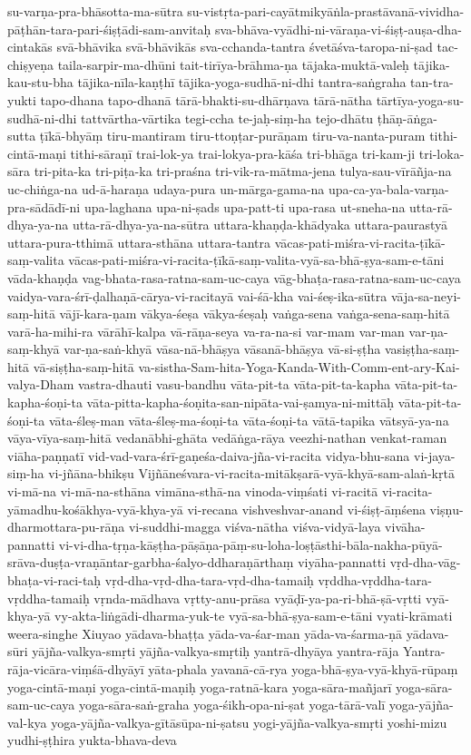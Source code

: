 {su-varṇa-pra-bhāsotta-ma-sūtra
su-vistṛta-pari-cayātmikyāṅla-prastāvanā-vividha-pāṭhān-tara-pari-śiṣṭādi-sam-anvitaḥ
sva-bhāva-vyādhi-ni-vāraṇa-vi-śiṣṭ-auṣa-dha-cintakās
svā-bhāvika
svā-bhāvikās
sva-cchanda-tantra
śvetāśva-taropa-ni-ṣad
tac-chiṣyeṇa
taila-sarpir-ma-dhūni
tait-tirīya-brāhma-ṇa
tājaka-muktā-valeḥ
tājika-kau-stu-bha
tājika-nīla-kaṇṭhī
tājika-yoga-sudhā-ni-dhi
tantra-saṅgraha
tan-tra-yukti
tapo-dhana
tapo-dhanā
tārā-bhakti-su-dhārṇava
tārā-nātha
tārtīya-yoga-su-sudhā-ni-dhi
tattvārtha-vārtika
tegi-ccha
te-jaḥ-siṃ-ha
tejo-dhātu
ṭhāṇ-āṅga-sutta
ṭīkā-bhyāṃ
tiru-mantiram
tiru-ttoṇṭar-purāṇam
tiru-va-nanta-puram
tithi-cintā-maṇi
tithi-sāraṇī
trai-lok-ya
trai-lokya-pra-kāśa
tri-bhāga
tri-kam-ji
tri-loka-sāra
tri-pita-ka
tri-piṭa-ka
tri-praśna
tri-vik-ra-mātma-jena
tulya-sau-vīrāñja-na
uc-chiṅga-na
ud-ā-haraṇa
udaya-pura
un-mārga-gama-na
upa-ca-ya-bala-varṇa-pra-sādādī-ni
upa-laghana
upa-ni-ṣads
upa-patt-ti
upa-rasa
ut-sneha-na
utta-rā-dhya-ya-na
utta-rā-dhya-ya-na-sūtra
uttara-khaṇḍa-khādyaka
uttara-paurastyā
uttara-pura-tthimā
uttara-sthāna
uttara-tantra
vācas-pati-miśra-vi-racita-ṭīkā-saṃ-valita
vācas-pati-miśra-vi-racita-ṭīkā-saṃ-valita-vyā-sa-bhā-ṣya-sam-e-tāni
vāda-khaṇḍa
vag-bhata-rasa-ratna-sam-uc-caya
vāg-bhaṭa-rasa-ratna-sam-uc-caya
vaidya-vara-śrī-ḍalhaṇā-cārya-vi-racitayā
vai-śā-kha
vai-śeṣ-ika-sūtra
vāja-sa-neyi-saṃ-hitā
vājī-kara-ṇam
vākya-śeṣa
vākya-śeṣaḥ
vaṅga-sena
vaṅga-sena-saṃ-hitā
varā-ha-mihi-ra
vārāhī-kalpa
vā-rāṇa-seya
va-ra-na-si
var-mam
var-man
var-ṇa-saṃ-khyā
var-ṇa-saṅ-khyā
vāsa-nā-bhāṣya
vāsanā-bhāṣya
vā-si-ṣṭha
vasiṣṭha-saṃ-hitā
vā-siṣṭha-saṃ-hitā
va-sistha-Sam-hita-Yoga-Kanda-With-Comm-ent-ary-Kai-valya-Dham
vastra-dhauti
vasu-bandhu
vāta-pit-ta
vāta-pit-ta-kapha
vāta-pit-ta-kapha-śoṇi-ta
vāta-pitta-kapha-śoṇita-san-nipāta-vai-ṣamya-ni-mittāḥ
vāta-pit-ta-śoṇi-ta
vāta-śleṣ-man
vāta-śleṣ-ma-śoṇi-ta
vāta-śoṇi-ta
vātā-tapika
vātsyā-ya-na
vāya-vīya-saṃ-hitā
vedanābhi-ghāta
vedāṅga-rāya
veezhi-nathan
venkat-raman
viāha-paṇṇatī
vid-vad-vara-śrī-gaṇeśa-daiva-jña-vi-racita
vidya-bhu-sana
vi-jaya-siṃ-ha
vi-jñāna-bhikṣu
Vijñāneśvara-vi-racita-mitākṣarā-vyā-khyā-sam-alaṅ-kṛtā
vi-mā-na
vi-mā-na-sthāna
vimāna-sthā-na
vinoda-viṃśati
vi-racitā
vi-racita-yāmadhu-kośākhya-vyā-khya-yā
vi-recana
vishveshvar-anand
vi-śiṣṭ-āṃśena
viṣṇu-dharmottara-pu-rāṇa
vi-suddhi-magga
viśva-nātha
viśva-vidyā-laya
vivāha-pannatti
vi-vi-dha-tṛṇa-kāṣṭha-pāṣāṇa-pāṃ-su-loha-loṣṭāsthi-bāla-nakha-pūyā-srāva-duṣṭa-vraṇāntar-garbha-śalyo-ddharaṇārthaṃ
viyāha-pannatti
vṛd-dha-vāg-bhaṭa-vi-raci-taḥ
vṛd-dha-vṛd-dha-tara-vṛd-dha-tamaiḥ
vṛddha-vṛddha-tara-vṛddha-tamaiḥ
vṛnda-mādhava
vṛtty-anu-prāsa
vyāḍī-ya-pa-ri-bhā-ṣā-vṛtti
vyā-khya-yā
vy-akta-liṅgādi-dharma-yuk-te
vyā-sa-bhā-ṣya-sam-e-tāni
vyati-krāmati
weera-singhe
Xiuyao
yādava-bhaṭṭa
yāda-va-śar-man
yāda-va-śarma-ṇā
yādava-sūri
yājña-valkya-smṛti
yājña-valkya-smṛtiḥ
yantrā-dhyāya
yantra-rāja
Yantra-rāja-vicāra-viṃśā-dhyāyī
yāta-phala
yavanā-cā-rya
yoga-bhā-ṣya-vyā-khyā-rūpaṃ
yoga-cintā-maṇi
yoga-cintā-maṇiḥ
yoga-ratnā-kara
yoga-sāra-mañjarī
yoga-sāra-sam-uc-caya
yoga-sāra-saṅ-graha
yoga-śikh-opa-ni-ṣat
yoga-tārā-valī
yoga-yājña-val-kya
yoga-yājña-valkya-gītāsūpa-ni-ṣatsu
yogi-yājña-valkya-smṛti
yoshi-mizu
yudhi-ṣṭhira
yukta-bhava-deva
}
